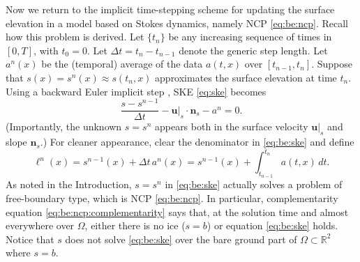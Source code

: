 \documentclass[hidelinks,onefignum,onetabnum,final]{siamart220329}  %
\newcommand{\RR}{\mathbb{R}}
\newcommand{\bn}{\mathbf{n}}
\newcommand{\bu}{\mathbf{u}}
\begin{document}
Now we return to the implicit time-stepping scheme for updating the surface elevation in a model based on Stokes dynamics, namely NCP \eqref{eq:be:ncp}.  Recall how this problem is derived.  Let $\{t_n\}$ be any increasing sequence of times in $[0,T]$, with $t_0=0$.  Let $\Delta t = t_n-t_{n-1}$ denote the generic step length.  Let $a^n(x)$ be the (temporal) average of the data $a(t,x)$ over $[t_{n-1},t_n]$.  Suppose that $s(x)=s^n(x)\approx s(t_n,x)$ approximates the surface elevation at time $t_n$.  Using a backward Euler implicit step \cite{AscherPetzold1998}, SKE \eqref{eq:ske} becomes
\begin{equation}
\frac{s - s^{n-1}}{\Delta t} - \bu|_{s} \cdot \bn_{s} - a^n = 0. \label{eq:be:ske}
\end{equation}
(Importantly, the unknown $s=s^n$ appears both in the surface velocity $\bu|_s$ and slope $\bn_s$.)  For cleaner appearance, clear the denominator in \eqref{eq:be:ske} and define
\begin{equation}
\ell^n(x) = s^{n-1}(x)+\Delta t\,a^n(x) = s^{n-1}(x) + \int_{t_{n-1}}^{t_n} a(t,x)\,dt. \label{eq:be:source}
\end{equation}
As noted in the Introduction, $s=s^n$ in \eqref{eq:be:ske} actually solves a problem of free-boundary type, which is NCP \eqref{eq:be:ncp}.  In particular, complementarity equation \eqref{eq:be:ncp:complementarity} says that, at the solution time and almost everywhere over $\Omega$, either there is no ice ($s=b$) or equation \eqref{eq:be:ske} holds.  Notice that $s$ does not solve \eqref{eq:be:ske} over the bare ground part of $\Omega \subset \RR^2$ where $s=b$.
\end{document}
